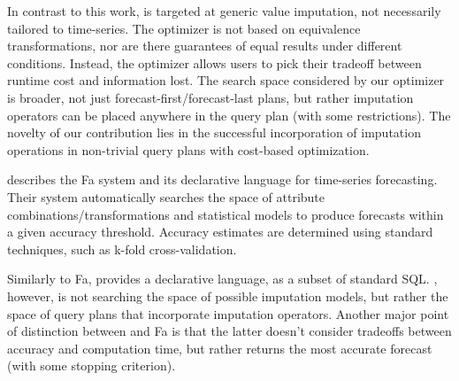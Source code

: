 In contrast to this work, \ProjectName{} is targeted at generic value imputation, not necessarily tailored to 
time-series. The optimizer is not based on equivalence transformations, nor are there guarantees of equal
results under different conditions. Instead, the optimizer allows users to pick their tradeoff between
runtime cost and information lost. The search space considered by our optimizer is broader, not just
forecast-first/forecast-last plans, but rather imputation operators can be placed anywhere in the query plan
(with some restrictions). The novelty of our contribution lies in the successful incorporation of
imputation operations in non-trivial query plans with cost-based optimization.

\cite{duan2007processing} describes the Fa system and its declarative language for time-series forecasting. Their
system automatically searches the space of attribute combinations/transformations and statistical models
to produce forecasts within a given accuracy threshold. Accuracy estimates are determined using
standard techniques, such as k-fold cross-validation. 

Similarly to Fa, \ProjectName{} provides a declarative language, as
a subset of standard SQL. \ProjectName{}, however, is not searching the space of possible
imputation models, but rather the space of query plans that incorporate imputation operators. Another major point
of distinction between \ProjectName{} and Fa is that the latter doesn't consider tradeoffs between accuracy and computation time, but rather returns the most accurate forecast (with some stopping criterion).



